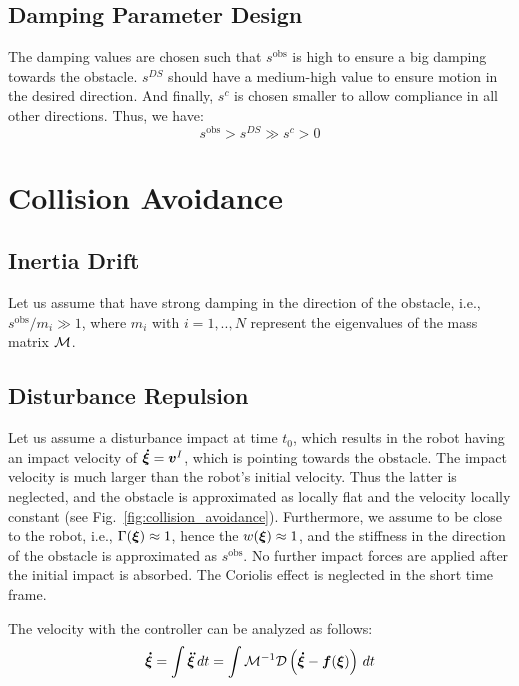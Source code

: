 \documentclass[conference]{IEEEtran}
\begin{document}
\subsection{Damping Parameter Design}
The damping values are chosen such that $s^{\mathrm{obs}}$ is high to ensure a big damping towards the obstacle. $s^{DS}$ should have a medium-high value to ensure motion in the desired direction. And finally, $s^{c}$ is chosen smaller to allow compliance in all other directions. Thus, we have:
\begin{equation}
s^{\mathrm{obs}} > s^{DS} \gg s^{c} > 0
\end{equation}




\section{Collision Avoidance} \label{sec:collision_avoidance}


\subsection{Inertia Drift}
Let us assume that have strong damping in the direction of the obstacle, i.e., $s^{\mathrm{obs}} / m_i \gg 1$, where $m_i$ with $i = 1, .., N$ represent the eigenvalues of the mass matrix $\mathcal{M}$. 


\subsection{Disturbance Repulsion}
Let us assume a disturbance impact at time $t_0$, which results in the robot having an impact velocity of $\boldsymbol{\dot \xi} = \boldsymbol{v}^I$, which is pointing towards the obstacle. The impact velocity is much larger than the robot's initial velocity. Thus the latter is neglected, and the obstacle is approximated as locally flat and the velocity locally constant (see Fig.~\ref{fig:collision_avoidance}). Furthermore, we assume to be close to the robot, i.e., $\Gamma(\boldsymbol{\xi}) \approx 1$, hence the $w(\boldsymbol{\xi}) \approx 1$, and the stiffness in the direction of the obstacle is approximated as $s^{\mathrm{obs}}$.
No further impact forces are applied after the initial impact is absorbed. The Coriolis effect is neglected in the short time frame.

The velocity with the controller can be analyzed as follows:
\begin{equation}
    \boldsymbol{\dot \xi} = \int \boldsymbol{\ddot \xi} \, dt = \int \mathcal{M}^{-1} \mathcal{D}  \left( \boldsymbol{\dot \xi} - \boldsymbol{f}(\boldsymbol{\xi}) \right) \, dt
\end{equation}
\end{document}
